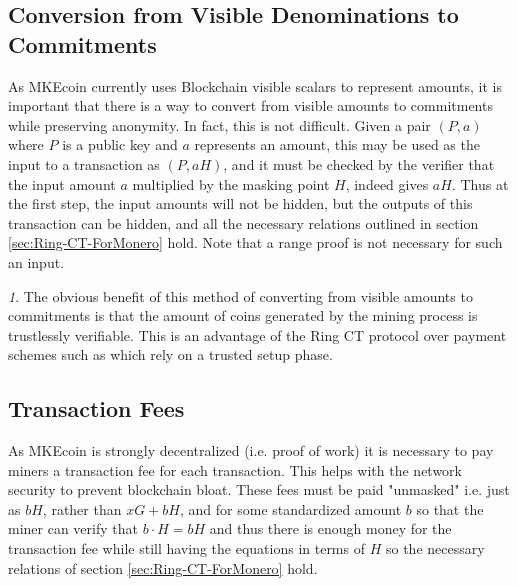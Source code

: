 \documentclass[12pt,oneside,english]{amsart}
\numberwithin{equation}{section}
\numberwithin{figure}{section}
\theoremstyle{plain}
\theoremstyle{plain}
\theoremstyle{remark}
\newtheorem{rem}[thm]{\protect\remarkname}
\theoremstyle{plain}
\theoremstyle{remark}
\theoremstyle{remark}
\theoremstyle{plain}
\theoremstyle{definition}
\providecommand{\remarkname}{Remark}
\begin{document}
\subsection{Conversion from Visible Denominations to Commitments}
\label{conversion}

As MKEcoin currently uses Blockchain visible scalars to represent amounts, it is important that there is a way to convert from visible amounts to commitments while preserving anonymity. In fact, this is not difficult. Given a pair $(P, a)$ where $P$ is a public key and $a$ represents an amount, this may be used as the input to a transaction as $(P, aH)$, and it must be checked by the verifier that the input amount $a$ multiplied by the masking point $H$, indeed gives $aH$. Thus at the first step, the input amounts will not be hidden, but the outputs of this transaction can be hidden, and all the necessary relations outlined in section \ref{sec:Ring-CT-ForMonero} hold. Note that a range proof is not necessary for such an input.
\begin{rem}
The obvious benefit of this method of converting from visible amounts to commitments is that the amount of coins generated by the mining process is trustlessly verifiable. This is an advantage of the Ring CT protocol over payment schemes such as \cite{Z} which rely on a trusted setup phase. 
\end{rem}
\subsection{Transaction Fees}
As MKEcoin is strongly decentralized (i.e. proof of work) it is necessary to pay miners a transaction fee for each transaction. This helps with the network security to prevent blockchain bloat. These fees must be paid "unmasked" i.e. just as $bH$, rather than $xG+bH$, and for some standardized amount $b$ so that the miner can verify that $b\cdot H = bH$ and thus there is enough money for the transaction fee while still having the equations in terms of $H$ so the necessary relations of section \ref{sec:Ring-CT-ForMonero} hold. 
\end{document}
